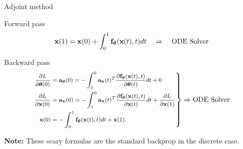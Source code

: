 \begin{frame}{Adjoint method}
	\begin{block}{Forward pass}
		\vspace{-0.3cm}
		\[
		\mathbf{x}(1) = \mathbf{x}(0) + \int^{1}_{0} \mathbf{f}_{\boldsymbol{\theta}}(\mathbf{x}(t), t) d t \quad \Rightarrow \quad \text{ODE Solver}
		\]
		\vspace{-0.4cm}
	\end{block}
	\begin{block}{Backward pass}
		\vspace{-0.5cm}
		\begin{equation*}
			\left.
			{\footnotesize 
				\begin{aligned}
					\frac{\partial L}{\partial \boldsymbol{\theta}(0)} &= \mathbf{a}_{\boldsymbol{\theta}}(0) =  - \int_{1}^{0} \mathbf{a}_{\mathbf{x}}(t)^T \frac{\partial \mathbf{f}_{\boldsymbol{\theta}}(\mathbf{x}(t), t)}{\partial \boldsymbol{\theta}(t)} dt + 0 \\
					\frac{\partial L}{\partial \mathbf{x}(0)} &= \mathbf{a}_{\mathbf{x}}(0) =  - \int_{1}^{0} \mathbf{a}_{\mathbf{x}}(t)^T \frac{\partial \mathbf{f}_{\boldsymbol{\theta}}(\mathbf{x}(t), t)}{\partial \mathbf{x}(t)} dt + \frac{\partial L}{\partial \mathbf{x}(1)} \\
					\mathbf{x}(0) &= - \int^{1}_{0} \mathbf{f}_{\boldsymbol{\theta}}(\mathbf{x}(t), t) d t  + \mathbf{x}(1).
				\end{aligned}
			}
			\right\rbrace
			\Rightarrow
			\text{ODE Solver}
		\end{equation*}
		\vspace{-0.4cm} 
	\end{block}
	\textbf{Note:} These scary formulas are the standard backprop in the discrete case.
\end{frame}
 